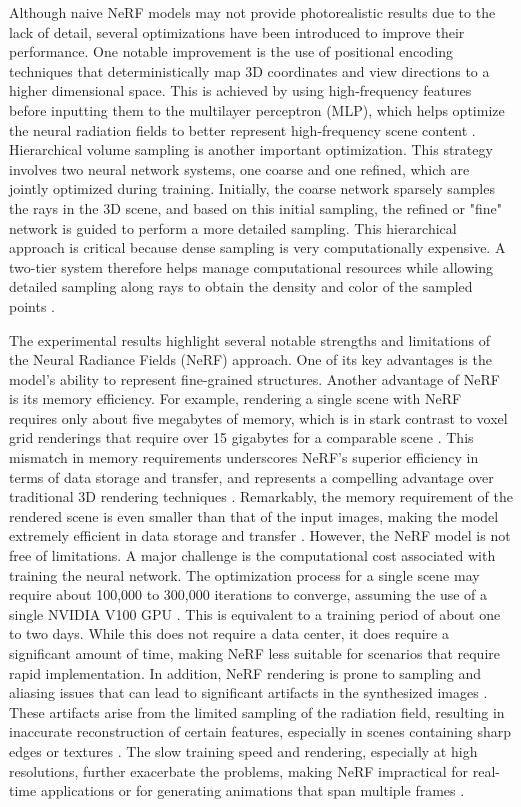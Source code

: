 Although naive NeRF models may not provide photorealistic results due to the lack of detail, several optimizations have been introduced to improve their performance. One notable improvement is the use of positional encoding techniques that deterministically map 3D coordinates and view directions to a higher dimensional space. This is achieved by using high-frequency features before inputting them to the multilayer perceptron (MLP), which helps optimize the neural radiation fields to better represent high-frequency scene content \citep{mildenhallNERF}. Hierarchical volume sampling is another important optimization. This strategy involves two neural network systems, one coarse and one refined, which are jointly optimized during training. Initially, the coarse network sparsely samples the rays in the 3D scene, and based on this initial sampling, the refined or "fine" network is guided to perform a more detailed sampling. This hierarchical approach is critical because dense sampling is very computationally expensive. A two-tier system therefore helps manage computational resources while allowing detailed sampling along rays to obtain the density and color of the sampled points \citep{arandjelović2021nerf}.

The experimental results highlight several notable strengths and limitations of the Neural Radiance Fields (NeRF) approach. One of its key advantages is the model's ability to represent fine-grained structures. Another advantage of NeRF is its memory efficiency. For example, rendering a single scene with NeRF requires only about five megabytes of memory, which is in stark contrast to voxel grid renderings that require over 15 gigabytes for a comparable scene \citep{mildenhallNERF}. This mismatch in memory requirements underscores NeRF's superior efficiency in terms of data storage and transfer, and represents a compelling advantage over traditional 3D rendering techniques \citep{mildenhallNERF}. Remarkably, the memory requirement of the rendered scene is even smaller than that of the input images, making the model extremely efficient in data storage and transfer \citep{mildenhallNERF}.
However, the NeRF model is not free of limitations. A major challenge is the computational cost associated with training the neural network. The optimization process for a single scene may require about 100,000 to 300,000 iterations to converge, assuming the use of a single NVIDIA V100 GPU \citep{mildenhallNERF}. This is equivalent to a training period of about one to two days. While this does not require a data center, it does require a significant amount of time, making NeRF less suitable for scenarios that require rapid implementation. In addition, NeRF rendering is prone to sampling and aliasing issues that can lead to significant artifacts in the synthesized images \citep{rabby2023beyondpixels}. These artifacts arise from the limited sampling of the radiation field, resulting in inaccurate reconstruction of certain features, especially in scenes containing sharp edges or textures \citep{rabby2023beyondpixels}. The slow training speed and rendering, especially at high resolutions, further exacerbate the problems, making NeRF impractical for real-time applications or for generating animations that span multiple frames \citep{rabby2023beyondpixels}.

